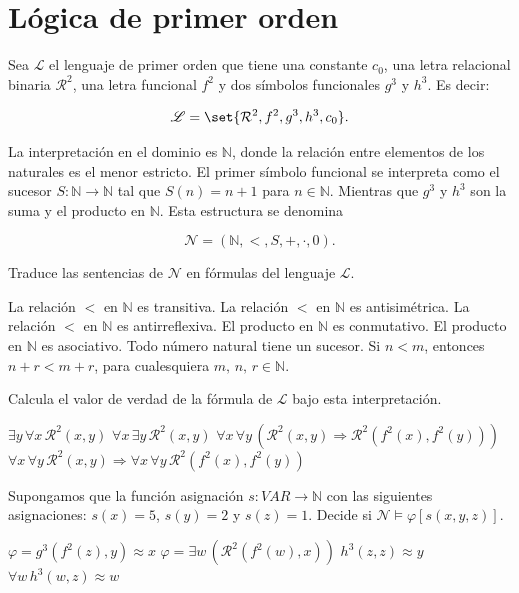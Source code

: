 \documentclass[fc]{tarea}
\begin{document}
\chapter*{Lógica de primer orden}

\begin{exercise}
Sea $\mathscr{L}$ el lenguaje de primer orden que tiene una constante $c_0$, 
una letra relacional binaria $\mathcal{R}^2$, una letra funcional $f^2$ 
y dos símbolos funcionales $g^3$ y $h^3$. Es decir:

\[
\mathscr{L} = \set{ \mathcal{R}^2, f^2, g^3, h^3, c_0 }.
\]

La interpretación en el dominio es $\mathbb{N}$, donde la relación entre 
elementos de los naturales es el menor estricto. El primer símbolo funcional 
se interpreta como el sucesor $S : \mathbb{N} \to \mathbb{N}$ tal que 
$S(n) = n + 1$ para $n \in \mathbb{N}$. Mientras que $g^3$ y $h^3$ son la suma 
y el producto en $\mathbb{N}$. Esta estructura se denomina 

\[
\mathscr{N} = (\mathbb{N}, <, S, +, \cdot, 0).
\]

Traduce las sentencias de $\mathscr{N}$ en fórmulas del lenguaje $\mathscr{L}$.

\begin{tasks}
    \task La relación $<$ en $\mathbb{N}$ es transitiva.
    \task La relación $<$ en $\mathbb{N}$ es antisimétrica.
    \task La relación $<$ en $\mathbb{N}$ es antirreflexiva.
    \task El producto en $\mathbb{N}$ es conmutativo.
    \task El producto en $\mathbb{N}$ es asociativo.
    \task Todo número natural tiene un sucesor.
    \task Si $n < m$, entonces $n + r < m + r$, para cualesquiera $m, \, n, \, r \in \mathbb{N}$.
\end{tasks}
    
Calcula el valor de verdad de la fórmula de $\mathscr{L}$ bajo esta interpretación.

\begin{tasks}
    \task $\exists y \, \forall x \, \mathcal{R}^2(x, y)$
    \task $\forall x \, \exists y \, \mathcal{R}^2(x, y)$
    \task $\forall x \, \forall y \, (\mathcal{R}^2(x, y) \Rightarrow \mathcal{R}^2(f^2(x), f^2(y)))$
    \task $\forall x \, \forall y \, \mathcal{R}^2(x, y) \Rightarrow \forall x \, \forall y \, \mathcal{R}^2(f^2(x), f^2(y))$
\end{tasks}

Supongamos que la función asignación $s : VAR \to \mathbb{N}$ con las siguientes asignaciones: $s(x) = 5$, $s(y) = 2$ y $s(z) = 1$.
Decide si $\mathscr{N} \vDash \varphi[s(x, y, z)]$.

\begin{tasks}
    \task $\varphi = g^3(f^2(z), y) \approx x$
    \task $\varphi = \exists w \, (\mathcal{R}^2(f^2(w), x))$
    \task $h^3(z, z) \approx y$
    \task $\forall w \, h^3(w, z) \approx w$
\end{tasks}

\end{exercise}
\end{document}
